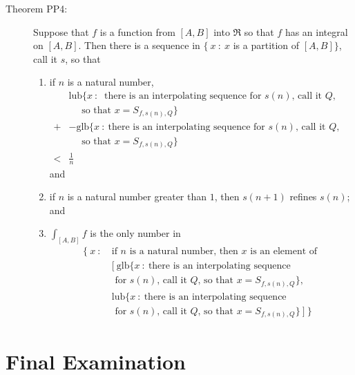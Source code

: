 \documentclass{article}
\begin{document}
\begin{description}
  \item[Theorem PP4:] Suppose that $f$ is a function from $[A,B]$ into $\Re$ so that $f$ has an integral on $[A,B]$. Then there is a sequence in $\{ \ x\ :\ x$ is a partition of $[A,B] \}$, call it $s$, so that 
    \begin{enumerate}[\hspace{1cm}(i.)]
      \item if $n$ is a natural number, 
        \begin{align*}
        \ & \text{lub} \{ x\ :\ \text{ there is an interpolating sequence for $s(n)$, call it $Q$, } \\
          & \quad \text{ so that } x = S_{f,s(n),Q} \} \\
        + & -\text{glb} \{x\ :\ \text{there is an interpolating sequence for $s(n)$, call it $Q$, } \\
          & \quad \text{ so that } x = S_{f,s(n),Q} \} \\
        < & \frac{1}{n} &
        \end{align*}
        and
      \item if $n$ is a natural number greater than $1$, then $s(n+1)$ refines $s(n)$; and
      \item $\int_{[A,B]} f$ is the only number in 
        \begin{align*}
        \{ \ x\ :\ & \text{if $n$ is a natural number, then $x$ is an element of } \\
                   & [ \ \text{glb} \{ x\ :\ \text{there is an interpolating sequence } \\
                   & \text{ for $s(n)$, call it $Q$, so that } x = S_{f,s(n),Q} \}, \ \\
                   & \text{lub} \{ x\ :\ \text{there is an interpolating sequence } \\
                   & \text{ for $s(n)$, call it $Q$, so that } x = S_{f,s(n),Q} \} \ ] \ \}
        \end{align*}
    \end{enumerate}

\end{description}



\newpage

\section{Final Examination}
\end{document}
